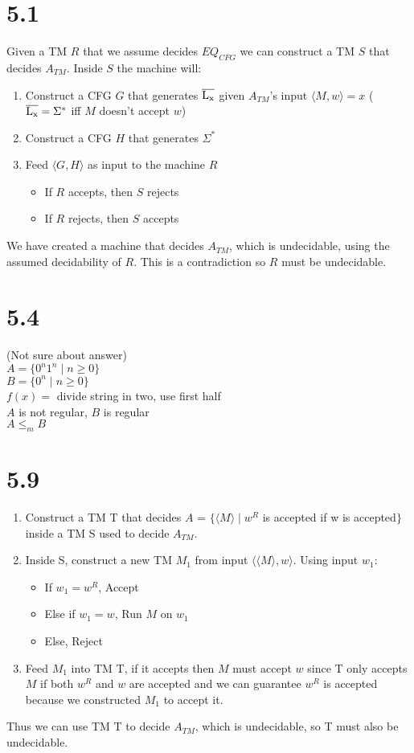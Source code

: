 \documentclass{article}
\begin{document}
\section*{5.1}
Given a TM $R$ that we assume decides $EQ_{CFG}$ we can construct a TM $S$ that decides $A_{TM}$. Inside $S$ the machine will:

\begin{enumerate}
    \item Construct a CFG $G$ that generates $\overline{\rm L_x}$ given $A_{TM}$'s input $\langle M, w\rangle = x$ ($\overline{\rm L_x} = \Sigma^*$ iff $M$ doesn't accept $w$)
    \item Construct a CFG $H$ that generates $\Sigma^*$
    \item Feed $\langle G, H \rangle$ as input to the machine $R$
    \begin{itemize}
        \item If $R$ accepts, then $S$ rejects
        \item If $R$ rejects, then $S$ accepts
    \end{itemize}
\end{enumerate}
We have created a machine that decides $A_{TM}$, which is undecidable, using the assumed decidability of $R$. This is a contradiction so $R$ must be undecidable.

\section*{5.4}
(Not sure about answer)\\
$A = \{0^n1^n \mid n \geq 0\}$\\
$B = \{0^n \mid n \geq 0\}$\\
$f(x)= $ divide string in two, use first half\\
$A$ is not regular, $B$ is regular\\
$A \leq_m B$
\section*{5.9}

\begin{enumerate}
    \item Construct a TM T that decides $A$ = $\{ \langle M \rangle \mid w^R$ is accepted if w is accepted$\}$ inside a TM S used to decide $A_{TM}$.
    \item Inside S, construct a new TM $M_1$ from input $\langle \langle M\rangle, w \rangle$. Using input $w_1$:
    \begin{itemize}
        \item If $w_1 = w^R$, Accept
        \item Else if $w_1 = w$, Run $M$ on $w_1$
        \item Else, Reject 
    \end{itemize}
    \item Feed ${M_1}$ into TM T, if it accepts then $M$ must accept $w$ since T only accepts ${M}$ if both $w^R$ and $w$ are accepted and we can guarantee $w^R$ is accepted because we constructed $M_1$ to accept it.
\end{enumerate}
Thus we can use TM T to decide $A_{TM}$, which is undecidable, so T must also be undecidable.
\end{document}
